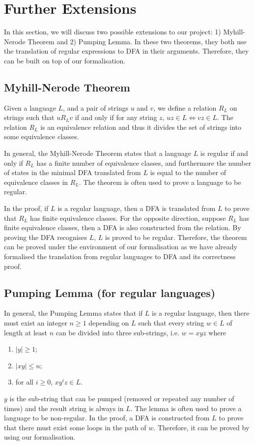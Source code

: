 \chapter{Further Extensions}
\par In this section, we will discuss two possible extensions to
our project: 1) Myhill-Nerode Theorem and 2) Pumping Lemma. In these two
theorems, they both use the translation of regular expressions to DFA
in their arguments. Therefore, they can be built on top of our
formalisation. 


\section{Myhill-Nerode Theorem}
\par Given a language \(L\), and a pair of
strings \(u\) and \(v\), we define a relation \(R_L\) on strings such
that \(u R_L v\) if and only if for any string \(z\), \(uz \in L
\Leftrightarrow vz \in L\). The relation \(R_L\) is an equivalence
relation and thus it divides the set of strings into some equivalence
classes.
\par In general, the Myhill-Nerode Theorem states that a language
\(L\) is regular if and only if \(R_L\) has a finite number of
equivalence classes, and furthermore the number of states in the
minimal DFA translated from \(L\) is equal to the number of
equivalence classes in \(R_L\). The theorem is often used to prove a
language to be regular. 

\par In the proof, if \(L\) is a regular language, then a DFA is
translated from \(L\) to prove that \(R_L\) has finite equivalence classes. For the opposite direction, suppose \(R_L\)
has finite equivalence classes, then a DFA is also constructed from
the relation. By proving the DFA recognises \(L\), \(L\) is proved to
be regular. Therefore, the theorem can
be proved under the environment of our formalisation as we have
already formalised the translation from regular languages to DFA and its correctness proof. 


\section{Pumping Lemma (for regular languages)}
\par In general, the
Pumping Lemma states that if \(L\) is a regular language, then there
must exist an integer \(n \geq 1\) depending on \(L\) such that every
string \(w \in L\) of length at least \(n\) can be divided into three
sub-strings, i.e. \(w = xyz\) where
\begin{enumerate}[nolistsep]
  \item \(|y| \geq 1\);
  \item \(|xy| \leq n\);
  \item for all \(i \geq 0\), \(xy^iz \in L\).
\end{enumerate}
\par \(y\) is the sub-string that can be pumped (removed or repeated
any number of times) and the result string is always in \(L\). The
lemma is often used to prove a language to be non-regular. In the proof, a DFA is constructed from \(L\) to prove that there
must exist some loops in the path of \(w\). Therefore, it can be
proved by using our formalisation. 